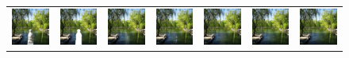 \documentclass[10pt,journal,compsoc]{IEEEtran}
\begin{document}
%
%
%
%
%
%
\begin{figure}[hbt]
	\small
	\setlength{\tabcolsep}{2.0pt}
	\centering
	\begin{tabular}{ccccccc}
		\includegraphics[width=.135\textwidth]{Object-Removal/GT15-0}  &
		\includegraphics[width=.135\textwidth]{Object-Removal/input15-0}  &
		\includegraphics[width=.135\textwidth]{Object-Removal/pconv15-0}  &
		\includegraphics[width=.135\textwidth]{Object-Removal/gc15-0}  &
		\includegraphics[width=.135\textwidth]{Object-Removal/ec15-0}  &
		\includegraphics[width=.135\textwidth]{Object-Removal/MEDFE1-1}  &
		\includegraphics[width=.135\textwidth]{Object-Removal/our15-0}  \\
		

\end{tabular}
\end{figure}
\end{document}
